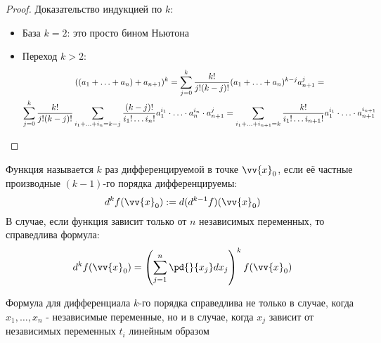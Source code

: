 \begin{proof}
	Доказательство индукцией по $k$:
	\begin{itemize}
		\item База $k = 2$: это просто бином Ньютона
		
		\item Переход $k > 2$:
		\begin{multline*}
			((a_1 + \ldots + a_n) + a_{n + 1})^k = \sum\limits_{j = 0}^k \frac{k!}{j! (k - j)!} (a_1 + \ldots + a_n)^{k - j} a_{n + 1}^j =
			\\
			\sum\limits_{j = 0}^k \frac{k!}{j! (k - j)!} \sum\limits_{i_1 + \ldots + i_n = k - j} \frac{(k - j)!}{i_1! \ldots i_n!} a_1^{i_1} \cdot \ldots \cdot a_n^{i_n} \cdot a_{n + 1}^j = \sum\limits_{i_1 + \ldots + i_{n + 1} = k} \frac{k!}{i_1! \ldots i_{n + 1}!} a_1^{i_1} \cdot \ldots \cdot a_{n + 1}^{i_{n + 1}}
		\end{multline*}
	\end{itemize}
\end{proof}

\begin{definition}
	Функция называется $k$ раз дифференцируемой в точке $\vv{x}_0$, если её частные производные $(k - 1)$-го порядка дифференцируемы:
	\[
		d^k f(\vv{x}_0) := d(d^{k - 1} f)(\vv{x}_0)
	\]
	В случае, если функция зависит только от $n$ независимых переменных, то справедлива формула:
	\[
		d^k f(\vv{x}_0) = \left(\suml_{j = 1}^n \pd{}{x_j} dx_j\right)^k f(\vv{x}_0)
	\]
\end{definition}

\begin{note}
	Формула для дифференциала $k$-го порядка справедлива не только в случае, когда $x_1, \ldots, x_n$ - независимые переменные, но и в случае, когда $x_j$ зависит от независимых переменных $t_i$ линейным образом
\end{note}
